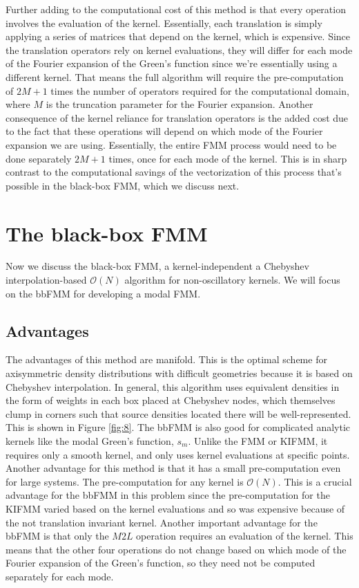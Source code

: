 \documentclass[11pt, oneside]{article}   	%
\begin{document}
Further adding to the computational cost of this method is that every operation involves the evaluation of the kernel. Essentially, each translation is simply applying a series of matrices that depend on the kernel, which is expensive. Since the translation operators rely on kernel evaluations, they will differ for each mode of the Fourier expansion of the Green's function since we're essentially using a different kernel. That means the full algorithm will require the pre-computation of $2M+1$ times the number of operators required for the computational domain, where $M$ is the truncation parameter for the Fourier expansion. Another consequence of the kernel reliance for translation operators is the added cost due to the fact that these operations will depend on which mode of the Fourier expansion we are using. Essentially, the entire FMM process would need to be done separately $2M+1$ times, once for each mode of the kernel. This is in sharp contrast to the computational savings of the vectorization of this process that's possible in the black-box FMM, which we discuss next.

\section{The black-box FMM}
Now we discuss the black-box FMM, a kernel-independent a Chebyshev interpolation-based $\mathcal{O}(N)$ algorithm for non-oscillatory kernels. We will focus on the bbFMM for developing a modal FMM.

\subsection{Advantages}
The advantages of this method are manifold. This is the optimal scheme for axisymmetric density distributions with difficult geometries because it is based on Chebyshev interpolation. In general, this algorithm uses equivalent densities in the form of weights in each box placed at Chebyshev nodes, which themselves clump in corners such that source densities located there will be well-represented. This is shown in Figure \ref{fig:8}. The bbFMM is also good for complicated analytic kernels like the modal Green's function, $s_m$. Unlike the FMM or KIFMM, it requires only a smooth kernel, and only uses kernel evaluations at specific points. Another advantage for this method is that it has a small pre-computation even for large systems. The pre-computation for any kernel is $\mathcal{O}(N)$. This is a crucial advantage for the bbFMM in this problem since the pre-computation for the KIFMM varied based on the kernel evaluations and so was expensive because of the not translation invariant kernel. Another important advantage for the bbFMM is that only the $M2L$ operation requires an evaluation of the kernel. This means that the other four operations do not change based on which mode of the Fourier expansion of the Green's function, so they need not be computed separately for each mode.
\end{document}
